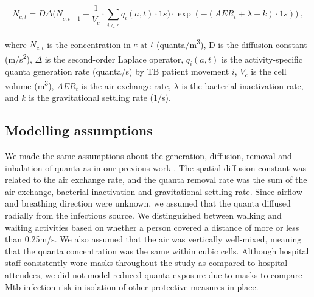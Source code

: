 \documentclass[11pt]{article}
\begin{document}
\[N_{c,t} = D\Delta{(N}_{c,t - 1} + \frac{1}{V_{c}} \cdot \sum_{i \in c}^{}{q_{i}(a,t) \cdot 1s)} \cdot \exp( - (AER_{t} + \lambda + k) \cdot 1s))~,\]

where \(N_{c,t}\) is the concentration in \(c\) at \(t\) (quanta/m\textsuperscript{3}), D is the diffusion constant (m/s\textsuperscript{2}), \(\Delta\) is the second-order Laplace operator, \(q_{i}(a,t)\) is the activity-specific quanta generation rate (quanta/s) by TB patient movement \(i\), \(V_{c}\) is the cell volume (m\textsuperscript{3}), \(AER_{t}\) is the air exchange rate, \(\lambda\) is the bacterial inactivation rate, and \(k\) is the gravitational settling rate (1/s).

\subsection{Modelling assumptions}\label{modelling-assumptions}

We made the same assumptions about the generation, diffusion, removal and inhalation of quanta as in our previous work \cite{banholzer2025PLOSComputBiol}. \label{chg:R2.23} The spatial diffusion constant was related to the air exchange rate, and the quanta removal rate was the sum of the air exchange, bacterial inactivation and gravitational settling rate. Since airflow and breathing direction were unknown, we assumed that the quanta diffused radially from the infectious source. We distinguished between walking and waiting activities based on whether a person covered a distance of more or less than 0.25m/s. We also assumed that the air was vertically well-mixed, meaning that the quanta concentration was the same within cubic cells. Although hospital staff consistently wore masks throughout the study as compared to hospital attendees, we did not model reduced quanta exposure due to masks to compare Mtb infection risk in isolation of other protective measures in place.
\end{document}
